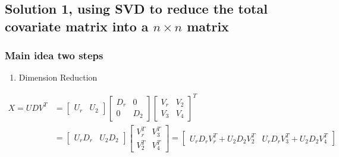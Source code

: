 \documentclass[]{article}
\providecommand{\tightlist}{%
  \setlength{\itemsep}{0pt}\setlength{\parskip}{0pt}}
\begin{document}
\subsection{\texorpdfstring{Solution 1, using SVD to reduce the total
covariate matrix into a \(n \times n\)
matrix}{Solution 1, using SVD to reduce the total covariate matrix into a n \textbackslash{}times n matrix}}\label{solution-1-using-svd-to-reduce-the-total-covariate-matrix-into-a-n-times-n-matrix}

\subsubsection{Main idea two steps}\label{main-idea-two-steps}

\begin{enumerate}
\def\labelenumi{\arabic{enumi}.}
\tightlist
\item
  Dimension Reduction
\end{enumerate}

\begin{align*}
  X = U D V^T &= \begin{bmatrix}
                      U_r & U_2
                      \end{bmatrix}
                      \begin{bmatrix}
                      D_r & 0\\
                      0 & D_2
                      \end{bmatrix}
                      \begin{bmatrix}
                      V_r & V_2\\
                      V_3 & V_4
                      \end{bmatrix}^T \\ 
              &= 
                      \begin{bmatrix}
                      U_rD_r & U_2D_2
                      \end{bmatrix}
                      \begin{bmatrix}
                      V_r^T & V_3^T\\
                      V_2^T & V_4^T
                      \end{bmatrix}
                      =
                      \begin{bmatrix}
                      U_rD_rV_r^T + U_2D_2V_2^T & U_rD_rV_3^T + U_2D_2 V_4^T
                      \end{bmatrix}
\end{align*}
\end{document}

